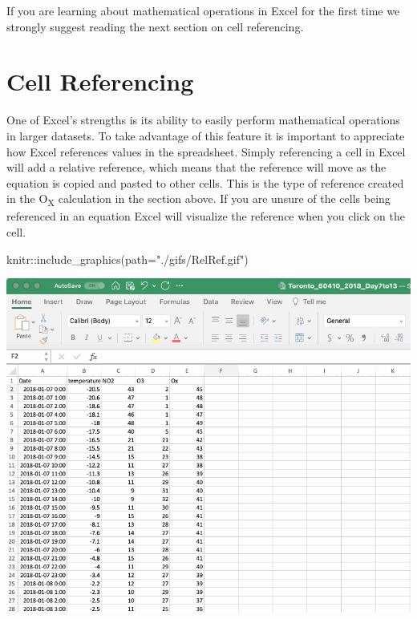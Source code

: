 \documentclass[
]{book}
\newenvironment{Shaded}{\begin{snugshade}}{\end{snugshade}}
\newcommand{\AttributeTok}[1]{\textcolor[rgb]{0.77,0.63,0.00}{#1}}
\newcommand{\FunctionTok}[1]{\textcolor[rgb]{0.00,0.00,0.00}{#1}}
\newcommand{\NormalTok}[1]{#1}
\newcommand{\SpecialCharTok}[1]{\textcolor[rgb]{0.00,0.00,0.00}{#1}}
\newcommand{\StringTok}[1]{\textcolor[rgb]{0.31,0.60,0.02}{#1}}
\begin{document}
If you are learning about mathematical operations in Excel for the first time we strongly suggest reading the next section on cell referencing.

\hypertarget{cell-referencing}{%
\section{Cell Referencing}\label{cell-referencing}}

One of Excel's strengths is its ability to easily perform mathematical operations in larger datasets. To take advantage of this feature it is important to appreciate how Excel references values in the spreadsheet. Simply referencing a cell in Excel will add a relative reference, which means that the reference will move as the equation is copied and pasted to other cells. This is the type of reference created in the O\textsubscript{X} calculation in the section above. If you are unsure of the cells being referenced in an equation Excel will visualize the reference when you click on the cell.

\begin{Shaded}
\begin{Highlighting}[]
\NormalTok{knitr}\SpecialCharTok{::}\FunctionTok{include\_graphics}\NormalTok{(}\AttributeTok{path=}\StringTok{"./gifs/RelRef.gif"}\NormalTok{)}
\end{Highlighting}
\end{Shaded}

\includegraphics{./gifs/RelRef.gif}
\end{document}
